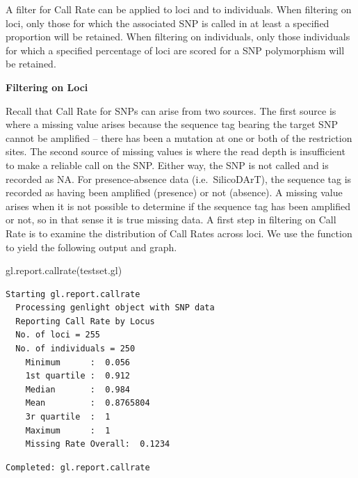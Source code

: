 \documentclass[
  letterpaper,
  DIV=11,
  numbers=noendperiod]{scrreprt}
\newenvironment{Shaded}{\begin{snugshade}}{\end{snugshade}}
\newcommand{\FunctionTok}[1]{\textcolor[rgb]{0.02,0.16,0.49}{#1}}
\newcommand{\NormalTok}[1]{\textcolor[rgb]{0.00,0.44,0.13}{#1}}
\let\textttOrig\texttt
\renewcommand{\texttt}[1]{\textttOrig{\color{blue}{#1}}}
\begin{document}
A filter for Call Rate can be applied to loci and to individuals. When
filtering on loci, only those for which the associated SNP is called in
at least a specified proportion will be retained. When filtering on
individuals, only those individuals for which a specified percentage of
loci are scored for a SNP polymorphism will be retained.

\textbf{Filtering on Loci}

Recall that Call Rate for SNPs can arise from two sources. The first
source is where a missing value arises because the sequence tag bearing
the target SNP cannot be amplified -- there has been a mutation at one
or both of the restriction sites. The second source of missing values is
where the read depth is insufficient to make a reliable call on the SNP.
Either way, the SNP is not called and is recorded as NA. For
presence-absence data (i.e.~SilicoDArT), the sequence tag is recorded as
having been amplified (presence) or not (absence). A missing value
arises when it is not possible to determine if the sequence tag has been
amplified or not, so in that sense it is true missing data. A first step
in filtering on Call Rate is to examine the distribution of Call Rates
across loci. We use the function \texttt{gl.report.callrate} to yield
the following output and graph.

\begin{Shaded}
\begin{Highlighting}[]
\FunctionTok{gl.report.callrate}\NormalTok{(testset.gl)}
\end{Highlighting}
\end{Shaded}

\begin{verbatim}
Starting gl.report.callrate 
  Processing genlight object with SNP data
  Reporting Call Rate by Locus
  No. of loci = 255 
  No. of individuals = 250 
    Minimum      :  0.056 
    1st quartile :  0.912 
    Median       :  0.984 
    Mean         :  0.8765804 
    3r quartile  :  1 
    Maximum      :  1 
    Missing Rate Overall:  0.1234 
\end{verbatim}

\begin{figure}[H]

{\centering \texttt{[image: basicfiltering\_files/figure-pdf/unnamed-chunk-6-1.pdf]}

}

\end{figure}

\begin{verbatim}
Completed: gl.report.callrate 
\end{verbatim}
\end{document}
